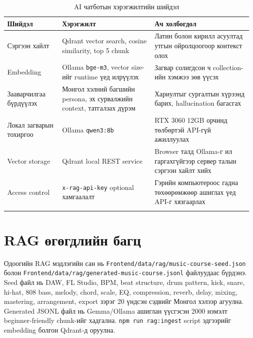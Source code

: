 \begin{longtable}{|p{}|p{}|p{}|}
  \hline
  \textbf{Шийдэл} & \textbf{Хэрэгжилт} & \textbf{Ач холбогдол} \\ \hline
  Сэргээн хайлт & Qdrant vector search, cosine similarity, top 5 chunk & Латин болон кирилл асуултад утгын ойролцоогоор контекст олох \\ \hline
  Embedding & Ollama \texttt{bge-m3}, vector size-ийг runtime үед илрүүлэх & Загвар солигдсон ч collection-ийн хэмжээ зөв үүсэх \\ \hline
  Зааварчилгаа бүрдүүлэх & Монгол хэлний багшийн persona, эх сурвалжийн context, татгалзах дүрэм & Хариултыг сургалтын хүрээнд барих, hallucination багасгах \\ \hline
  Локал загварын тохиргоо & Ollama \texttt{qwen3:8b} & RTX 3060 12GB орчинд төлбөртэй API-гүй ажиллуулах \cite{ollama_qwen3} \\ \hline
  Vector storage & Qdrant local REST service & Browser талд Ollama-г ил гаргахгүйгээр сервер талын сэргээн хайлт хийх \\ \hline
  Access control & \texttt{x-rag-api-key} optional хамгаалалт & Гэрийн компьютероос гадна төхөөрөмжөөр ашиглах үед API-г хязгаарлах \\ \hline
  \caption{AI чатботын хэрэгжилтийн шийдэл}
  \label{tab:ch3-chatbot}
\end{longtable}

\section{RAG өгөгдлийн багц}
Одоогийн RAG мэдлэгийн сан нь \texttt{Frontend/data/rag/music-course-seed.json} болон \texttt{Frontend/data/rag/generated-music-course.jsonl} файлуудаас бүрдэнэ. Seed файл нь DAW, FL Studio, BPM, beat structure, drum pattern, kick, snare, hi-hat, 808 bass, melody, chord, scale, EQ, compression, reverb, delay, mixing, mastering, arrangement, export зэрэг 20 үндсэн сэдвийг Монгол хэлээр агуулна. Generated JSONL файл нь Gemma/Ollama ашиглан үүсгэсэн 2000 нэмэлт beginner-friendly chunk-ийг хадгална. \texttt{npm run rag:ingest} script эдгээрийг embedding болгон Qdrant-д оруулна.

